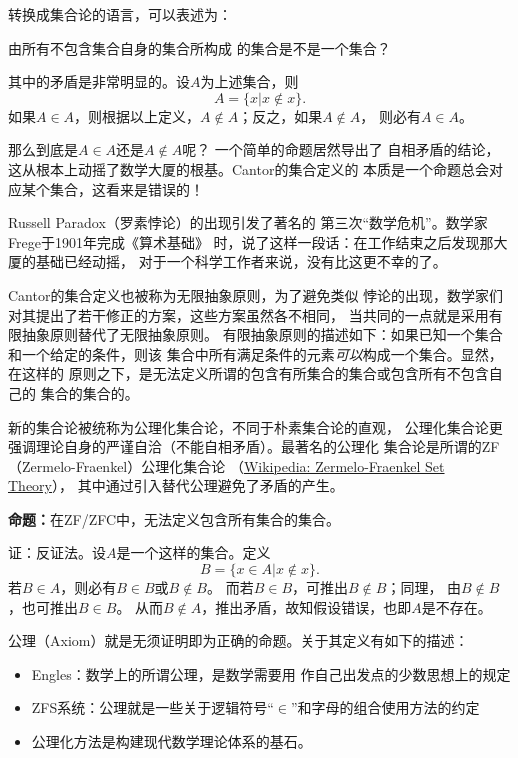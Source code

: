 \begin{shaded}
	转换成集合论的语言，可以表述为：

	\centerline{\kaishu 由所有不包含集合自身的集合所构成
	的集合是不是一个集合？}

	其中的矛盾是非常明显的。设$A$为上述集合，则
	$$A=\{x|x\notin x\}.$$ 
	如果$A\in A$，则根据以上定义，$A\notin A$；反之，如果$A\notin A$，
	则必有$A\in A$。

	那么到底是$A\in A$还是$A\notin A$呢？ 一个简单的命题居然导出了
	自相矛盾的结论，这从根本上动摇了数学大厦的根基。Cantor的集合定义的
	本质是一个命题总会对应某个集合，这看来是错误的！

	Russell Paradox（{\kaishu 罗素悖论}）的出现引发了著名的
	{\kaishu 第三次“数学危机”}。数学家Frege于1901年完成《算术基础》
	时，说了这样一段话：{\kaishu 在工作结束之后发现那大厦的基础已经动摇，
	对于一个科学工作者来说，没有比这更不幸的了。}
	
	Cantor的集合定义也被称为{\kaishu 无限抽象原则}，为了避免类似
	悖论的出现，数学家们对其提出了若干修正的方案，这些方案虽然各不相同，
	当共同的一点就是采用{\kaishu 有限抽象原则}替代了无限抽象原则。
	有限抽象原则的描述如下：如果已知一个集合和一个给定的条件，则该
	集合中所有满足条件的元素{\it 可以}构成一个集合。显然，在这样的
	原则之下，是无法定义所谓的包含有所集合的集合或包含所有不包含自己的
	集合的集合的。

	新的集合论被统称为{\kaishu 公理化集合论}，不同于朴素集合论的直观，
	公理化集合论更强调理论自身的严谨自洽（不能自相矛盾）。最著名的公理化
	集合论是所谓的{\kaishu ZF（Zermelo-Fraenkel）公理化集合论}
	（\href{https://en.wikipedia.org/wiki/Zermelo–Fraenkel_set_theory}
	{Wikipedia: Zermelo-Fraenkel Set Theory}），
	其中通过引入{\kaishu 替代公理}避免了矛盾的产生。
	  
	{\bf 命题：}在ZF/ZFC中，无法定义包含所有集合的集合。
	
	证：反证法。设$A$是一个这样的集合。定义
	$$B=\{x\in A|x\notin x\}.$$
	若$B\in A$，则必有$B\in B$或$B\notin B$。
	而若$B\in B$，可推出$B\notin B$；同理，
	由$B\notin B$，也可推出$B\in B$。
	从而$B\notin A$，推出矛盾，故知假设错误，也即$A$是不存在。\fin

	公理（Axiom）就是无须证明即为正确的命题。关于其定义有如下的描述：
	\begin{itemize}
	  \item Engles：数学上的所谓公理，是数学需要用
	  作自己出发点的少数思想上的规定 
	  \item ZFS系统：公理就是一些关于逻辑符号{“$\in$”}和{字母}的组合使用方法的约定
	  \item {\kaishu 公理化方法}是构建现代数学理论体系的基石。
	\end{itemize}


\end{shaded}
